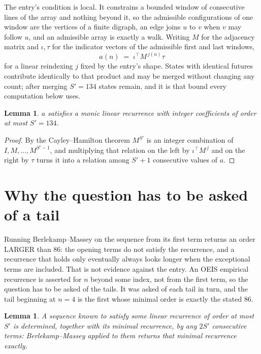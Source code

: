 \documentclass[11pt,a4paper]{article}
\theoremstyle{plain}
\newtheorem{lemma}[theorem]{Lemma}
\theoremstyle{definition}
\begin{document}
The entry's condition is local. It constrains a bounded window of consecutive lines of the
array and nothing beyond it, so the admissible configurations of one window are the vertices of
a finite digraph, an edge joins $u$ to $v$ when $v$ may follow $u$, and an admissible array is
exactly a walk. Writing $M$ for the adjacency matrix and $\iota,\tau$ for the indicator vectors
of the admissible first and last windows,
\[
a(n)\;=\;\iota^{\!\top}M^{\,j(n)}\tau
\]
for a linear reindexing $j$ fixed by the entry's shape. States with identical futures
contribute identically to that product and may be merged without changing any count; after
merging $S'=134$ states remain, and it is that bound every computation below uses.

\begin{lemma}\label{lem:cf}
$a$ satisfies a monic linear recurrence with integer coefficients of order at most $S'=134$.
\end{lemma}

\begin{proof}
By the Cayley--Hamilton theorem $M^{S'}$ is an integer combination of $I,M,\dots,M^{S'-1}$,
and multiplying that relation on the left by $\iota^{\!\top}M^{\,j}$ and on the right by
$\tau$ turns it into a relation among $S'+1$ consecutive values of $a$.
\end{proof}

\section{Why the question has to be asked of a tail}

Running Berlekamp--Massey on the sequence from its first term returns an order LARGER than $86$: the opening terms do not satisfy the recurrence, and a recurrence that holds only eventually always looks longer when the exceptional terms are included. That is not evidence against the entry. An OEIS empirical recurrence is asserted for $n$ beyond some index, not from the first term, so the question has to be asked of the tails. It was asked of each tail in turn, and the tail beginning at $n=4$ is the first whose minimal order is exactly the stated $86$.

\begin{lemma}\label{lem:bm}
A sequence known to satisfy some linear recurrence of order at most $S'$ is determined,
together with its minimal recurrence, by any $2S'$ consecutive terms: Berlekamp--Massey applied
to them returns that minimal recurrence exactly.
\end{lemma}
\end{document}
